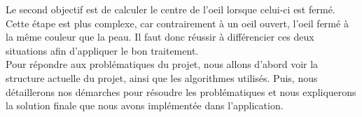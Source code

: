 Le second objectif est de calculer le centre de l'oeil lorsque celui-ci est fermé. Cette étape est plus complexe,
car contrairement à un oeil ouvert, l'oeil fermé à la même couleur que la peau. Il faut donc réussir à différencier ces
deux situations afin d'appliquer le bon traitement.\\ 

Pour répondre aux problématiques du projet, nous allons d'abord voir la structure actuelle du projet, ainsi que les algorithmes
utilisés. Puis, nous détaillerons nos démarches pour résoudre les problématiques et nous expliquerons la solution finale que nous avons
implémentée dans l'application.\\

\newpage
